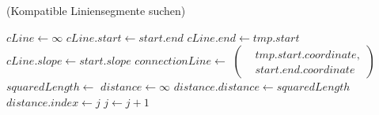 \begin{algorithm}[!ht]
\caption{ (Kompatible Liniensegmente suchen)}
\label{alg:mergelines3}
\begin{algorithmic}[1]
		\label{alg:mergelines3-isorientationcompatible}
			\State $\mathit{cLine} \gets \infty$
			\label{alg:mergelines3-cline-start}
			\State $\mathit{cLine.start} \gets \mathit{start.end}$
			\State $\mathit{cLine.end} \gets \mathit{tmp.start}$
			\State $\mathit{cLine.slope} \gets \mathit{start.slope}$
			\label{alg:mergelines3-cline-end}
			\label{alg:mergelines3-isbridged}
				\State $\mathit{connectionLine} \gets$ 
				$\left(
				\begin{aligned}
					& \mathit{tmp.start.coordinate},\\
					& \mathit{start.end.coordinate}
				\end{aligned}\right)$
				\label{alg:mergelines3-save-start}
				\State $\mathit{squaredLength} \gets$ 
				\State $\mathit{distance} \gets \infty$
				\State $\mathit{distance.distance} \gets \mathit{squaredLength}$
				\State $\mathit{distance.index} \gets j$
				\State {}
				\label{alg:mergelines3-save-end}
			\EndIf
		\EndIf
		\State $j \gets j + 1$
	\EndFor
	\label{alg:mergelines3-loop-end}
\end{algorithmic}
\end{algorithm}
